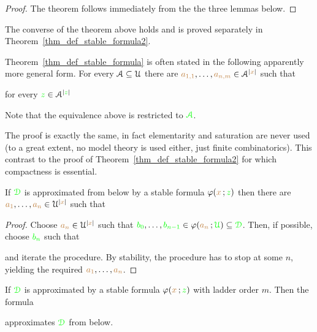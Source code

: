 \documentclass[creche.tex]{subfiles}
\begin{document}
\begin{proof}
The theorem follows immediately from the the three lemmas below.
\end{proof}

The converse of the theorem above holds and is proved separately in Theorem~\ref{thm_def_stable_formula2}.  

\begin{remark}
Theorem~\ref{thm_def_stable_formula} is often stated in the following  apparently more general form.
For every $\EuScript A\subseteq\EuScript U$ there are ${\color{brown} a_{1,1}},\dots,{\color{brown} a_{n,m}}\in \EuScript A^{|{\color{brown} x}|}$ such that

\hfill for every ${\color{green} z}\in\EuScript A^{|{\color{green} z}|}$ 

Note that the equivalence above is restricted to ${\color{green}\EuScript A}$.

The proof is exactly the same, in fact elementarity and saturation are never used (to a great extent, no model theory is used either, just finite combinatorics). This contrast to the proof of Theorem~\ref{thm_def_stable_formula2} for which compactness is essential.\QED
\end{remark}



\begin{lemma}
If ${\color{green}\EuScript D}$ is approximated from below by a stable formula $\varphi({\color{brown} x}\,;{\color{green} z})$ then there are ${\color{brown} a_1},\dots,{\color{brown} a_n}\in\EuScript U^{|{\color{brown} x}|}$ such that 


\end{lemma}

\begin{proof}
Choose ${\color{brown} a_n}\in\EuScript U^{|{\color{brown} x}|}$ such that ${\color{green} b_0},\dots,{\color{green} b_{n-1}}\in\varphi({\color{brown} a_n}\,;{\color{green}\EuScript U})\subseteq{\color{green}\EuScript D}$.
Then, if possible, choose ${\color{green} b_n}$ such that


and iterate the procedure.
By stability, the procedure has to stop at some $n$, yielding the required  ${\color{brown} a_1},\dots,{\color{brown} a_n}$.
\end{proof}


\begin{lemma}
If ${\color{green}\EuScript D}$ is approximated by a stable formula $\varphi({\color{brown} x}\,;{\color{green} z})$ with ladder order $m$.
Then the formula 


approximates ${\color{green}\EuScript D}$ from below.
\end{lemma}
\end{document}
